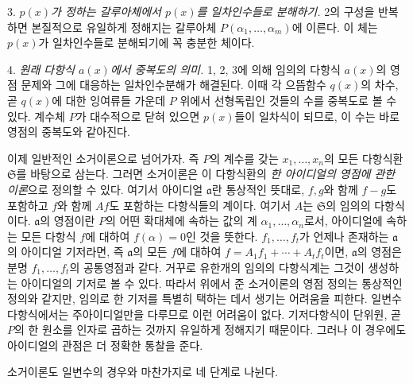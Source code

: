 3. \emph{\(p(x)\)가 정하는 갈루아체에서 \(p(x)\)를 일차인수들로 분해하기.} 2의 구성을 반복하면 본질적으로 유일하게 정해지는 갈루아체 \(P(\alpha_1,\ldots,\alpha_m)\)에 이른다. 이 체는 \(p(x)\)가 일차인수들로 분해되기에 꼭 충분한 체이다.

4. \emph{원래 다항식 \(a(x)\)에서 중복도의 의미.} 1, 2, 3에 의해 임의의 다항식 \(a(x)\)의 영점 문제와 그에 대응하는 일차인수분해가 해결된다. 이때 각 으뜸함수 \(q(x)\)의 차수, 곧 \(q(x)\)에 대한 잉여류들 가운데 \(P\) 위에서 선형독립인 것들의 수를 중복도로 볼 수 있다. 계수체 \(P\)가 대수적으로 닫혀 있으면 \(p(x)\)들이 일차식이 되므로, 이 수는 바로 영점의 중복도와 같아진다.

이제 일반적인 소거이론으로 넘어가자. 즉 \(P\)의 계수를 갖는 \(x_1,\ldots,x_n\)의 모든 다항식환 \(\mathfrak S\)를 바탕으로 삼는다. 그러면 소거이론은 이 다항식환의 \emph{한 아이디얼의 영점에 관한 이론}으로 정의할 수 있다. 여기서 아이디얼 \(\mathfrak a\)란 통상적인 뜻대로, \(f,g\)와 함께 \(f-g\)도 포함하고 \(f\)와 함께 \(Af\)도 포함하는 다항식들의 계이다. 여기서 \(A\)는 \(\mathfrak S\)의 임의의 다항식이다. \(\mathfrak a\)의 영점이란 \(P\)의 어떤 확대체에 속하는 값의 계 \(\alpha_1,\ldots,\alpha_n\)로서, 아이디얼에 속하는 모든 다항식 \(f\)에 대하여 \(f(\alpha)=0\)인 것을 뜻한다. \(f_1,\ldots,f_t\)가 언제나 존재하는 \(\mathfrak a\)의 아이디얼 기저라면, 즉 \(\mathfrak a\)의 모든 \(f\)에 대하여 \(f=A_1f_1+\cdots+A_tf_t\)이면, \(\mathfrak a\)의 영점은 분명 \(f_1,\ldots,f_t\)의 공통영점과 같다. 거꾸로 유한개의 임의의 다항식계는 그것이 생성하는 아이디얼의 기저로 볼 수 있다. 따라서 위에서 준 소거이론의 영점 정의는 통상적인 정의와 같지만, 임의로 한 기저를 특별히 택하는 데서 생기는 어려움을 피한다. 일변수 다항식에서는 주아이디얼만을 다루므로 이런 어려움이 없다. 기저다항식이 단위원, 곧 \(P\)의 한 원소를 인자로 곱하는 것까지 유일하게 정해지기 때문이다. 그러나 이 경우에도 아이디얼의 관점은 더 정확한 통찰을 준다.

소거이론도 일변수의 경우와 마찬가지로 네 단계로 나뉜다.

